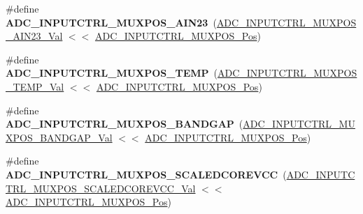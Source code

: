 \begin{DoxyCompactItemize}
\item 
\hypertarget{group___s_a_m_l21___a_d_c_ga0015175e5e451c03bc8cb59cd00f240b}{}\#define {\bfseries A\+D\+C\+\_\+\+I\+N\+P\+U\+T\+C\+T\+R\+L\+\_\+\+M\+U\+X\+P\+O\+S\+\_\+\+A\+I\+N23}~(\hyperlink{group___s_a_m_l21___a_d_c_ga647cce884be7f43f6afafb7b93417ce3}{A\+D\+C\+\_\+\+I\+N\+P\+U\+T\+C\+T\+R\+L\+\_\+\+M\+U\+X\+P\+O\+S\+\_\+\+A\+I\+N23\+\_\+\+Val} $<$$<$ \hyperlink{group___s_a_m_l21___a_d_c_ga583868be285e1c06c9a93dfd552d8c6a}{A\+D\+C\+\_\+\+I\+N\+P\+U\+T\+C\+T\+R\+L\+\_\+\+M\+U\+X\+P\+O\+S\+\_\+\+Pos})\label{group___s_a_m_l21___a_d_c_ga0015175e5e451c03bc8cb59cd00f240b}

\item 
\hypertarget{group___s_a_m_l21___a_d_c_gaf1b6a0978a0bd06158a99c48962ef1e0}{}\#define {\bfseries A\+D\+C\+\_\+\+I\+N\+P\+U\+T\+C\+T\+R\+L\+\_\+\+M\+U\+X\+P\+O\+S\+\_\+\+T\+E\+M\+P}~(\hyperlink{group___s_a_m_l21___a_d_c_ga0e92110d209c9909cd18714850249870}{A\+D\+C\+\_\+\+I\+N\+P\+U\+T\+C\+T\+R\+L\+\_\+\+M\+U\+X\+P\+O\+S\+\_\+\+T\+E\+M\+P\+\_\+\+Val} $<$$<$ \hyperlink{group___s_a_m_l21___a_d_c_ga583868be285e1c06c9a93dfd552d8c6a}{A\+D\+C\+\_\+\+I\+N\+P\+U\+T\+C\+T\+R\+L\+\_\+\+M\+U\+X\+P\+O\+S\+\_\+\+Pos})\label{group___s_a_m_l21___a_d_c_gaf1b6a0978a0bd06158a99c48962ef1e0}

\item 
\hypertarget{group___s_a_m_l21___a_d_c_ga9091f5d2a1cf750679116e91f3e4fc73}{}\#define {\bfseries A\+D\+C\+\_\+\+I\+N\+P\+U\+T\+C\+T\+R\+L\+\_\+\+M\+U\+X\+P\+O\+S\+\_\+\+B\+A\+N\+D\+G\+A\+P}~(\hyperlink{group___s_a_m_l21___a_d_c_ga06e3489e60e6b9a147d334178bc54804}{A\+D\+C\+\_\+\+I\+N\+P\+U\+T\+C\+T\+R\+L\+\_\+\+M\+U\+X\+P\+O\+S\+\_\+\+B\+A\+N\+D\+G\+A\+P\+\_\+\+Val} $<$$<$ \hyperlink{group___s_a_m_l21___a_d_c_ga583868be285e1c06c9a93dfd552d8c6a}{A\+D\+C\+\_\+\+I\+N\+P\+U\+T\+C\+T\+R\+L\+\_\+\+M\+U\+X\+P\+O\+S\+\_\+\+Pos})\label{group___s_a_m_l21___a_d_c_ga9091f5d2a1cf750679116e91f3e4fc73}

\item 
\hypertarget{group___s_a_m_l21___a_d_c_ga640f10376a7bd30d5efbf405f9598e79}{}\#define {\bfseries A\+D\+C\+\_\+\+I\+N\+P\+U\+T\+C\+T\+R\+L\+\_\+\+M\+U\+X\+P\+O\+S\+\_\+\+S\+C\+A\+L\+E\+D\+C\+O\+R\+E\+V\+C\+C}~(\hyperlink{group___s_a_m_l21___a_d_c_ga9d77bb05e49f1e56dce22cdbeda42df3}{A\+D\+C\+\_\+\+I\+N\+P\+U\+T\+C\+T\+R\+L\+\_\+\+M\+U\+X\+P\+O\+S\+\_\+\+S\+C\+A\+L\+E\+D\+C\+O\+R\+E\+V\+C\+C\+\_\+\+Val} $<$$<$ \hyperlink{group___s_a_m_l21___a_d_c_ga583868be285e1c06c9a93dfd552d8c6a}{A\+D\+C\+\_\+\+I\+N\+P\+U\+T\+C\+T\+R\+L\+\_\+\+M\+U\+X\+P\+O\+S\+\_\+\+Pos})\label{group___s_a_m_l21___a_d_c_ga640f10376a7bd30d5efbf405f9598e79}


\end{DoxyCompactItemize}
